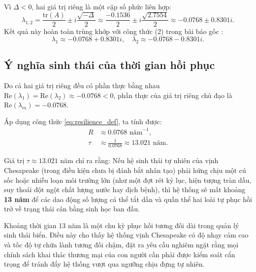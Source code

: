 Vì $\Delta < 0$, hai giá trị riêng là một cặp số phức liên hợp:
\begin{equation}
\lambda_{1, 2} = \frac{\mathrm{tr}(A)}{2} \pm i\frac{\sqrt{-\Delta}}{2} \approx \frac{-0.1536}{2} \pm i\frac{\sqrt{2.7554}}{2} \approx -0.0768 \pm 0.8301i.
\end{equation}
Kết quả này hoàn toàn trùng khớp với công thức (2) trong bài báo gốc \cite{panayotova2023bioeconomic}:
\begin{equation}
\lambda_1 \approx -0.0768 + 0.8301i, \quad \lambda_2 \approx -0.0768 - 0.8301i.
\end{equation}

\subsection{Ý nghĩa sinh thái của thời gian hồi phục}
Do cả hai giá trị riêng đều có phần thực bằng nhau $\mathrm{Re}(\lambda_1) = \mathrm{Re}(\lambda_2) \approx -0.0768 < 0$, phần thực của giá trị riêng chủ đạo là $\mathrm{Re}(\lambda_m) = -0.0768$.

Áp dụng công thức \eqref{eq:resilience_def}, ta tính được:
\begin{align}
R &\approx 0.0768 \text{ năm}^{-1}, \\
\tau &\approx \frac{1}{0.0768} \approx 13.021 \text{ năm}.
\end{align}

\begin{tcolorbox}[colback=teal!5!white, colframe=teal, arc=2mm, title=\textbf{Ý nghĩa sinh thái quan trọng của chỉ số độ đàn hồi:}]
Giá trị $\tau \approx 13.021$ năm chỉ ra rằng: Nếu hệ sinh thái tự nhiên của vịnh Chesapeake (trong điều kiện chưa bị đánh bắt nhân tạo) phải hứng chịu một cú sốc hoặc nhiễu loạn môi trường lớn (như một đợt rét kỷ lục, hiện tượng tràn dầu, suy thoái đột ngột chất lượng nước hay dịch bệnh), thì hệ thống sẽ mất khoảng \textbf{13 năm} để các dao động số lượng cá thể tắt dần và quần thể hai loài tự phục hồi trở về trạng thái cân bằng sinh học ban đầu.

Khoảng thời gian 13 năm là một chu kỳ phục hồi tương đối dài trong quản lý sinh thái biển. Điều này cho thấy hệ thống vịnh Chesapeake có độ nhạy cảm cao và tốc độ tự chữa lành tương đối chậm, đặt ra yêu cầu nghiêm ngặt rằng mọi chính sách khai thác thương mại của con người cần phải được kiểm soát cẩn trọng để tránh đẩy hệ thống vượt qua ngưỡng chịu đựng tự nhiên.
\end{tcolorbox}
